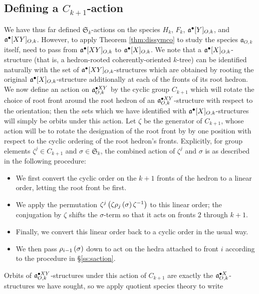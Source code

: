 \documentclass[sectionflow,singlespace,twoside,boldmathhdr]{brandiss} %
\numberwithin{section}{chapter}
\numberwithin{figure}{chapter}
\begin{document}
\subsection{Defining a $C_{k+1}$-action}\label{ss:zaction}
We have thus far defined $\mathfrak{S}_{k}$-actions on the species $H_{k}$, $F_{k}$, $\pointed{\mathfrak{a}}[Y]_{O, k}$, and $\pointed{\mathfrak{a}}[XY]_{O, k}$.
However, to apply Theorem \ref{thm:dissymco} to study the species $\mathfrak{a}_{O, k}$ itself, need to pass from $\pointed{\mathfrak{a}}[XY]_{O, k}$ to $\pointed{\mathfrak{a}}[X]_{O, k}$.
We note that a $\pointed{\mathfrak{a}}[X]_{O, k}$-structure (that is, a hedron-rooted coherently-oriented $k$-tree) can be identified naturally with the set of $\pointed{\mathfrak{a}}[XY]_{O, k}$-structures which are obtained by rooting the original $\pointed{\mathfrak{a}}[X]_{O, k}$-structure additionally at each of the fronts of its root hedron.
We now define an action on $\pointed[XY]{\mathfrak{a}}_{O, k}$ by the cyclic group $C_{k+1}$ which will rotate the choice of root front around the root hedron of an $\pointed[XY]{\mathfrak{a}}_{O, k}$-structure with respect to the orientation; then the sets which we have identified with $\pointed{\mathfrak{a}}[X]_{O, k}$-structures will simply be orbits under this action.
Let $\zeta$ be the generator of $C_{k+1}$, whose action will be to rotate the designation of the root front by by one position with respect to the cyclic ordering of the root hedron's fronts.
Explicitly, for group elements $\zeta^{j} \in C_{k+1}$ and $\sigma \in \mathfrak{S}_{k}$, the combined action of $\zeta^{j}$ and $\sigma$ is as described in the following procedure:
\begin{itemize}
\item We first convert the cyclic order on the $k+1$ fronts of the hedron to a linear order, letting the root front be first.
\item We apply the permutation $\zeta^{j} \pbrac{\zeta \rho_{j} \pbrac{\sigma} \zeta^{-1}}$ to this linear order; the conjugation by $\zeta$ shifts the $\sigma$-term so that it acts on fronts $2$ through $k+1$.
\item Finally, we convert this linear order back to a cyclic order in the usual way.  
\item We then pass $\rho_{i - 1} \pbrac{\sigma}$ down to act on the hedra attached to front $i$ according to the procedure in \S \ref{ss:saction}.
\end{itemize}
Orbits of $\pointed[XY]{\mathfrak{a}}_{O, k}$-structures under this action of $C_{k+1}$ are exactly the $\pointed[X]{\mathfrak{a}}_{O, k}$-structures we have sought, so we apply quotient species theory to write
\end{document}
